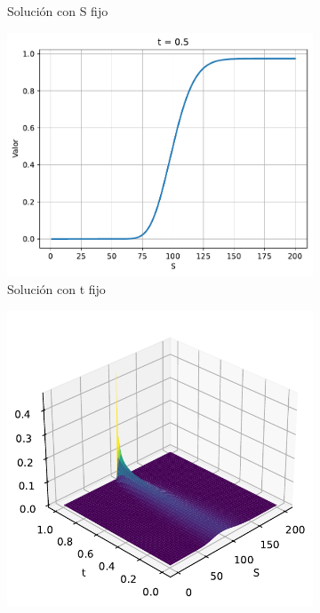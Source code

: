 \begin{figure}[H]
\begin{subfigure}[b]{0.3\linewidth}
        \caption{Solución con S fijo}
    \end{subfigure}
    \begin{subfigure}[b]{0.3\linewidth}
        \includegraphics[width=\linewidth]{Imagenes/Parte1/6_Sols/Binary_Call/BinaryCalltFIjo.pdf}
        \caption{Solución con t fijo}
    \end{subfigure}
    \begin{subfigure}[b]{0.3\linewidth}
        \includegraphics[width=\linewidth]{Imagenes/Parte1/6_Sols/Binary_Call/Binary_Call_Delta.pdf}

\end{subfigure}
\end{figure}
